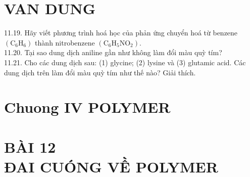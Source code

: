 \documentclass[10pt]{article}
\begin{document}
\section*{VAN DUNG}
11.19. Hãy viết phương trình hoá học của phản ứng chuyển hoá từ benzene $\left(\mathrm{C}_{6} \mathrm{H}_{6}\right)$ thành nitrobenzene $\left(\mathrm{C}_{6} \mathrm{H}_{5} \mathrm{NO}_{2}\right)$.\\
11.20. Tại sao dung dịch aniline gần như không làm đổi màu quỳ tím?\\
11.21. Cho các dung dịch sau: (1) glycine; (2) lysine và (3) glutamic acid. Các dung dịch trên làm đổi màu quỳ tím như thế nào? Giải thích.

\section*{Chuong IV POLYMER}
\section*{BÀI 12 \\
 ĐAI CUÓNG VỀ POLYMER}
\end{document}
